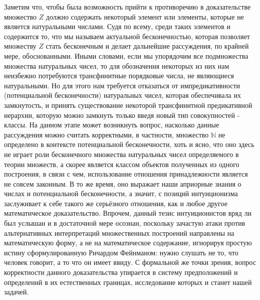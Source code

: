 \documentclass[12pt]{article}
\begin{document}
Заметим что, чтобы была возможность прийти к противоречию в доказательстве множество $Z$ должно содержать некоторый элемент или элементы, которые не является натуральными числами. Судя по всему, среди таких элементов и содержится то, что мы называем актуальной бесконечностью, которая позволяет множеству $Z$ стать бесконечным и делает дальнейшие рассуждения, по крайней мере, обоснованными. Иными словами, если мы упорядочим все подмножества множества натуральных чисел, то для обозначения некоторых из них нам неизбежно потребуются трансфинитные порядковые числа, не являющиеся натуральными. Но для этого нам требуется отказаться от импредикативности (потенциальной бесконечности) натуральных чисел, которая обеспечивала их замкнутость, и принять существование некоторой трансфинитной предикативной иерархии, которую можно замкнуть только введя новый тип совокупностей - классы. На данном этапе может возникнуть вопрос, насколько данные рассуждения можно считать корректными, в частности, множество $\mathbb{N}$ не определено в контексте потенциальной бесконечности, хоть и ясно, что оно здесь не играет роли бесконечного множества натуральных чисел определяемого в теории множеств, а скорее является классом объектов полученных из одного построения, в связи с чем, использование отношения принадлежности является не совсем законным. В то же время, оно выражает наши априорные знания о числах и потенциальной бесконечности, а значит, с позиций интуиционизма заслуживает к себе такого же серьёзного отношения, как и любое другое математическое доказательство. Впрочем, данный тезис интуиционистов вряд ли был услышан и в достаточной мере осознан, поскольку зачастую атаки против альтернативных интерпретаций множественных построений направлены на математическую форму, а не на математическое содержание, игнорируя простую истину сформулированную Ричардом Фейнманом: нужно слушать не то, что человек говорит, а то что он имеет ввиду. С формальной же точки зрения, вопрос корректности данного доказательства упирается в систему предположений и определений в их естественных границах, исследование которых и станет нашей задачей. 
\end{document}
